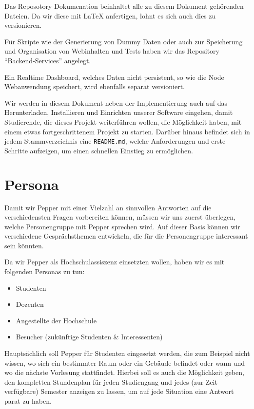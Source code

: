 Das Reposotory Dokumenation beinhaltet alle zu diesem Dokument gehörenden Dateien. Da wir diese mit \LaTeX{} anfertigen, lohnt es sich auch dies zu versionieren.

Für Skripte wie der Generierung von Dummy Daten oder auch zur Speicherung und Organisation von Webinhalten und Tests haben wir das Repository ``Backend-Services'' angelegt.

Ein Realtime Dashboard, welches Daten nicht persistent, so wie die Node Webanwendung speichert, wird ebenfalls separat versioniert.

Wir werden in diesem Dokument neben der Implementierung auch auf das Herunterladen, Installieren und Einrichten
unserer Software eingehen, damit Studierende, die dieses Projekt weiterführen wollen, die Möglichkeit
haben, mit einem etwas fortgeschrittenem Projekt zu starten. Darüber hinaus befindet sich in jedem Stammverzeichnis
eine \verb|README.md|, welche Anforderungen und erste Schritte aufzeigen, um einen schnellen Einstieg zu ermöglichen.\\

\section{Persona}
Damit wir Pepper mit einer Vielzahl an sinnvollen Antworten auf die verschiedensten Fragen vorbereiten können, müssen wir uns zuerst überlegen, welche Personengruppe mit Pepper sprechen wird. Auf dieser Basis können wir verschiedene Gesprächsthemen entwickeln, die für die Personengruppe interessant sein könnten.

Da wir Pepper als Hochschulassiszenz einsetzten wollen, haben wir es mit folgenden Personas zu tun:
\begin{itemize}
    \item Studenten
    \item Dozenten
    \item Angestellte der Hochschule
    \item Besucher (zukünftige Studenten \& Interessenten)
\end{itemize}

Hauptsächlich soll Pepper für Studenten eingesetzt werden, die zum Beispiel nicht wissen, wo sich ein bestimmter Raum oder ein Gebäude befindet oder wann und wo die nächste Vorlesung stattfindet. Hierbei soll es auch die Möglichkeit geben, den kompletten Stundenplan für jeden Studiengang und jedes (zur Zeit verfügbare) Semester anzeigen zu lassen, um auf jede Situation eine Antwort parat zu haben.

